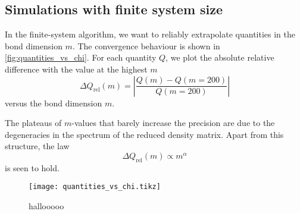 \subsection{Simulations with finite system size}
In the finite-system algorithm, we want to reliably extrapolate quantities in the bond dimension $m$.
The convergence behaviour is shown in \autoref{fig:quantities_vs_chi}.
For each quantity $Q$, we plot the absolute relative difference with the value at the highest $m$
\begin{equation}
  \Delta Q_{\text{rel}}(m) = \left| \frac{Q(m) - Q(m = 200)}{Q(m = 200)} \right|
\end{equation}
versus the bond dimension $m$.

The plateaus of $m$-values that barely increase the precision are due to the degeneracies in the spectrum of the reduced
density matrix. Apart from this structure, the law
\begin{equation}
  \Delta Q_{\text{rel}}(m) \propto m^{\alpha}
\end{equation}
is seen to hold.



\begin{figure}
  \texttt{[image: quantities\_vs\_chi.tikz]}
  \caption{hallooooo}\label{fig:quantities_vs_chi}
\end{figure}


%
%
